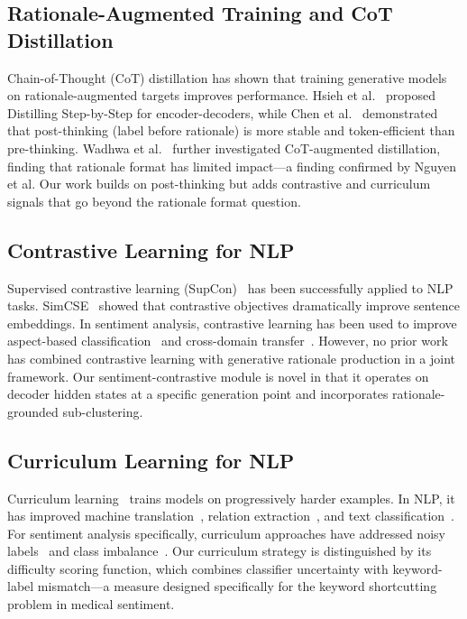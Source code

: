 \documentclass[conference]{IEEEtran}
\begin{document}
\subsection{Rationale-Augmented Training and CoT Distillation}

Chain-of-Thought (CoT) distillation has shown that training generative models on rationale-augmented targets improves performance. Hsieh et al.~\cite{hsieh2023distilling} proposed Distilling Step-by-Step for encoder-decoders, while Chen et al.~\cite{chen2024post} demonstrated that post-thinking (label before rationale) is more stable and token-efficient than pre-thinking. Wadhwa et al.~\cite{wadhwa2024investigating} further investigated CoT-augmented distillation, finding that rationale format has limited impact---a finding confirmed by Nguyen et al. Our work builds on post-thinking but adds contrastive and curriculum signals that go beyond the rationale format question.

\subsection{Contrastive Learning for NLP}

Supervised contrastive learning (SupCon)~\cite{khosla2020supervised} has been successfully applied to NLP tasks. SimCSE~\cite{gao2021simcse} showed that contrastive objectives dramatically improve sentence embeddings. In sentiment analysis, contrastive learning has been used to improve aspect-based classification~\cite{li2021learning} and cross-domain transfer~\cite{wu2022contrastive}. However, no prior work has combined contrastive learning with generative rationale production in a joint framework. Our sentiment-contrastive module is novel in that it operates on decoder hidden states at a specific generation point and incorporates rationale-grounded sub-clustering.

\subsection{Curriculum Learning for NLP}

Curriculum learning~\cite{bengio2009curriculum} trains models on progressively harder examples. In NLP, it has improved machine translation~\cite{platanios2019competence}, relation extraction~\cite{zhang2019curriculum}, and text classification~\cite{xu2020curriculum}. For sentiment analysis specifically, curriculum approaches have addressed noisy labels~\cite{wang2021curriculum} and class imbalance~\cite{zhou2020curriculum}. Our curriculum strategy is distinguished by its difficulty scoring function, which combines classifier uncertainty with keyword-label mismatch---a measure designed specifically for the keyword shortcutting problem in medical sentiment.
\end{document}
